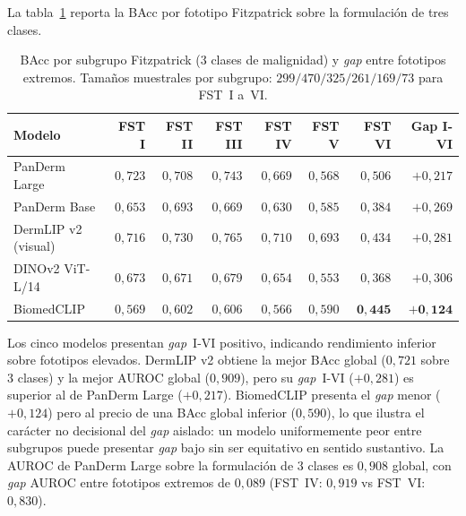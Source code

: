 La tabla~\ref{tab:equidad-fototipo} reporta la BAcc por fototipo
Fitzpatrick sobre la formulación de tres clases.

\begin{table}[H]
\centering
\footnotesize
\setlength{\tabcolsep}{4pt}
\renewcommand{\arraystretch}{0.95}
\caption{BAcc por subgrupo Fitzpatrick (3 clases de malignidad) y
\emph{gap} entre fototipos extremos. Tamaños muestrales por
subgrupo: $299 / 470 / 325 / 261 / 169 / 73$ para FST~I a~VI.}
\label{tab:equidad-fototipo}
\begin{tabular}{lrrrrrrr}
\hline
Modelo                    & FST I         & FST II        & FST III       & FST IV        & FST V         & FST VI        & Gap I-VI \\
\hline
PanDerm Large             & $0{,}723$     & $0{,}708$     & $0{,}743$     & $0{,}669$     & $0{,}568$     & $0{,}506$     & $+0{,}217$ \\
PanDerm Base              & $0{,}653$     & $0{,}693$     & $0{,}669$     & $0{,}630$     & $0{,}585$     & $0{,}384$     & $+0{,}269$ \\
DermLIP v2 (visual)       & $0{,}716$     & $0{,}730$     & $0{,}765$     & $0{,}710$     & $0{,}693$     & $0{,}434$     & $+0{,}281$ \\
DINOv2 ViT-L/14           & $0{,}673$     & $0{,}671$     & $0{,}679$     & $0{,}654$     & $0{,}553$     & $0{,}368$     & $+0{,}306$ \\
BiomedCLIP                & $0{,}569$     & $0{,}602$     & $0{,}606$     & $0{,}566$     & $0{,}590$     & $\mathbf{0{,}445}$ & $\mathbf{+0{,}124}$ \\
\hline
\end{tabular}
\end{table}

Los cinco modelos presentan \emph{gap}~I-VI positivo, indicando
rendimiento inferior sobre fototipos elevados. DermLIP v2 obtiene la
mejor BAcc global ($0{,}721$ sobre $3$ clases) y la mejor AUROC
global ($0{,}909$), pero su \emph{gap}~I-VI ($+0{,}281$) es
superior al de PanDerm Large ($+0{,}217$). BiomedCLIP presenta el
\emph{gap} menor ($+0{,}124$) pero al precio de una BAcc global
inferior ($0{,}590$), lo que ilustra el carácter no decisional
del \emph{gap} aislado: un modelo uniformemente peor entre
subgrupos puede presentar \emph{gap} bajo sin ser equitativo en
sentido sustantivo. La AUROC de PanDerm Large sobre la formulación
de $3$ clases es $0{,}908$ global, con \emph{gap} AUROC entre
fototipos extremos de $0{,}089$ (FST~IV: $0{,}919$ vs FST~VI:
$0{,}830$).

